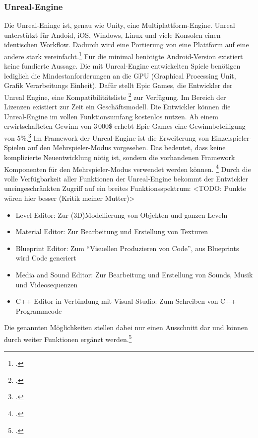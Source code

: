 	\subsubsection*{Unreal-Engine}
	Die Unreal-Eninge ist, genau wie Unity, eine Multiplattform-Engine. Unreal unterstützt für Andoid, iOS, Windows, Linux und viele Konsolen einen identischen Workflow. Dadurch wird eine Portierung von eine Plattform auf eine andere stark vereinfacht.\footcite[\url{https://www.unrealengine.com/what-is-unreal-engine-4}]{unreal-home} Für die minimal benötigte Android-Version existiert keine fundierte Aussage. Die mit Unreal-Engine entwickelten Spiele benötigen lediglich die Mindestanforderungen an die GPU (Graphical Processing Unit, Grafik Verarbeitungs Einheit). Dafür stellt Epic Games, die Entwickler der Unreal Engine, eine Kompatibilitätsliste \footcite[\url{https://docs.unrealengine.com/latest/INT/Platforms/Android/DeviceCompatibility/index.html}]{unreal-home} zur Verfügung. Im Bereich der Lizenzen existiert zur Zeit ein Geschäftsmodell. Die Entwickler können die Unreal-Engine im vollen Funktionsumfang kostenlos nutzen. Ab einem erwirtschafteten Gewinn von $3\, 000$\$ erhebt Epic-Games eine Gewinnbeteiligung von $5$\%.\footcite[\url{https://www.unrealengine.com/custom-licensing}]{unreal-home} Im Framework der Unreal-Engine ist die Erweiterung von Einzelspieler-Spielen auf den Mehrspieler-Modus vorgesehen. Das bedeutet, dass keine komplizierte Neuentwicklung nötig ist, sondern die vorhandenen Framework Komponenten für den Mehrspieler-Modus verwendet werden können. \footcite[\url{https://docs.unrealengine.com/latest/INT/Gameplay/Networking/Overview/index.html}]{unreal-home} Durch die volle Verfügbarkeit aller Funktionen der Unreal-Engine bekommt der Entwickler uneingeschränkten Zugriff auf ein breites Funktionsspektrum:
	<TODO: Punkte wären hier besser (Kritik meiner Mutter)>
	\begin{itemize}
		\item{Level Editor: Zur (3D)Modellierung von Objekten und ganzen Leveln}
		\item{Material Editor: Zur Bearbeitung und Erstellung von Texturen}
		\item{Blueprint Editor: Zum \enquote{Visuellen Produzieren von Code}, aus Blueprints wird Code generiert}
		\item{Media and Sound Editor: Zur Bearbeitung und Erstellung von Sounds, Musik und Videosequenzen}
		\item{C++ Editor in Verbindung mit Visual Studio: Zum Schreiben von C++ Programmcode}
	\end{itemize}
	Die genannten Möglichkeiten stellen dabei nur einen Ausschnitt dar und können durch weiter Funktionen ergänzt werden.\footcite[https://docs.unrealengine.com/latest/INT/GettingStarted/SubEditors/]{unreal-home}

